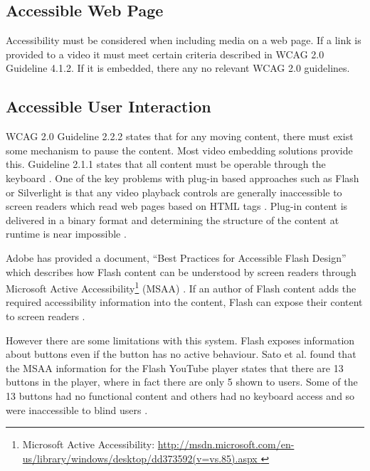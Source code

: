 \documentclass[journal]{IEEEtran}
\begin{document}
\subsection{Accessible Web Page}
Accessibility must be considered when including media on a web page. If a link is provided to a video it must meet certain criteria described in WCAG 2.0 Guideline 4.1.2. If it is embedded, there any no relevant WCAG 2.0 guidelines.

\subsection{Accessible User Interaction}
WCAG 2.0 Guideline 2.2.2 states that for any moving content, there must exist some mechanism to pause the content. Most video embedding solutions provide this. Guideline 2.1.1 states that all content must be operable through the keyboard \cite{standard:wcag2}. One of the key problems with plug-in based approaches such as Flash or Silverlight is that any video playback controls are generally inaccessible to screen readers which read web pages based on HTML tags \cite{inproceedings:transformingFlashToXML}\cite{incollection:accessibilityEvaluationForMultimediaContent}. Plug-in content is delivered in a binary format and determining the structure of the content at runtime is near impossible \cite{inproceedings:transformingFlashToXML}.

Adobe has provided a document, ``Best Practices for Accessible Flash Design'' which describes how Flash content can be understood by screen readers through Microsoft Active Accessibility\footnote{Microsoft Active Accessibility: \url{http://msdn.microsoft.com/en-us/library/windows/desktop/dd373592(v=vs.85).aspx
}} (MSAA) \cite{whitePaper:bestPracticesForAccessibleFlashDesign}. If an author of Flash content adds the required accessibility information into the content, Flash can expose their content to screen readers \cite{inproceedings:automaticAccesibilityTranscodingForFlashContent}.

However there are some limitations with this system. Flash exposes information about buttons even if the button has no active behaviour. Sato et al. found that the MSAA information for the Flash YouTube player states that there are 13 buttons in the player, where in fact there are only 5 shown to users. Some of the 13 buttons had no functional content and others had no keyboard access and so were inaccessible to blind users \cite{inproceedings:automaticAccesibilityTranscodingForFlashContent}.
\end{document}
